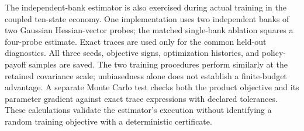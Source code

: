 The independent-bank estimator is also exercised during actual training in the coupled ten-state economy. One implementation uses two independent banks of two Gaussian Hessian-vector probes; the matched single-bank ablation squares a four-probe estimate. Exact traces are used only for the common held-out diagnostics. All three seeds, objective signs, optimization histories, and policy-payoff samples are saved. The two training procedures perform similarly at the retained covariance scale; unbiasedness alone does not establish a finite-budget advantage. A separate Monte Carlo test checks both the product objective and its parameter gradient against exact trace expressions with declared tolerances. These calculations validate the estimator's execution without identifying a random training objective with a deterministic certificate.
